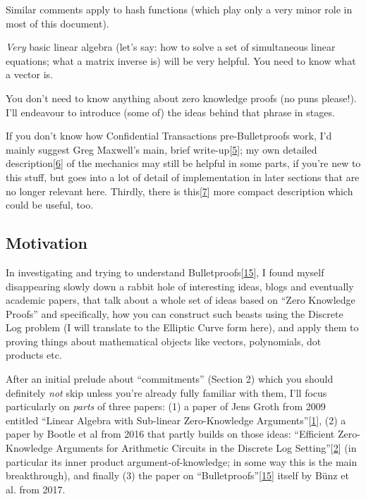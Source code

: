 \documentclass[10pt,a4paper]{article}
\begin{document}
Similar comments apply to hash functions (which play only a very minor
role in most of this document).

\emph{Very} basic linear algebra (let's say: how to solve a set of
simultaneous linear equations; what a matrix inverse is) will be very
helpful. You need to know what a vector is.

You don't need to know anything about zero knowledge proofs (no puns
please!). I'll endeavour to introduce (some of) the ideas behind that
phrase in stages.

If you don't know how Confidential Transactions pre-Bulletproofs work,
I'd mainly suggest Greg Maxwell's main, brief
write-up{[}\protect\hyperlink{anchor-2}{5}{]}; my own detailed
description{[}\protect\hyperlink{anchor-3}{6}{]} of the mechanics may
still be helpful in some parts, if you're new to this stuff, but goes
into a lot of detail of implementation in later sections that are no
longer relevant here. Thirdly, there is
this{[}\protect\hyperlink{anchor-4}{7}{]} more compact description which
could be useful, too.

\hypertarget{motivation}{%
\subsection[Motivation]{\texorpdfstring{\protect\hypertarget{anchor-5}{}{}Motivation}{Motivation}}\label{motivation}}

In investigating and trying to understand
Bulletproofs{[}\protect\hyperlink{anchor-6}{15}{]}, I found myself
disappearing slowly down a rabbit hole of interesting ideas, blogs and
eventually academic papers, that talk about a whole set of ideas based
on ``Zero Knowledge Proofs'' and specifically, how you can construct
such beasts using the Discrete Log problem (I will translate to the
Elliptic Curve form here), and apply them to proving things about
mathematical objects like vectors, polynomials, dot products etc.

After an initial prelude about ``commitments'' (Section 2) which you
should definitely \emph{not} skip unless you're already fully familiar
with them, I'll focus particularly on \emph{parts} of three papers: (1)
a paper of Jens Groth from 2009 entitled ``Linear Algebra with
Sub-linear Zero-Knowledge
Arguments''{[}\protect\hyperlink{anchor-7}{1}{]}, (2) a paper by Bootle
et al from 2016 that partly builds on those ideas: ``Efficient
Zero-Knowledge Arguments for Arithmetic Circuits in the Discrete Log
Setting''{[}\protect\hyperlink{anchor-8}{2}{]} (in particular its inner
product argument-of-knowledge; in some way this is the main
breakthrough), and finally (3) the paper on
``Bulletproofs''{[}\protect\hyperlink{anchor-6}{15}{]} itself by Bünz et
al. from 2017.
\end{document}
